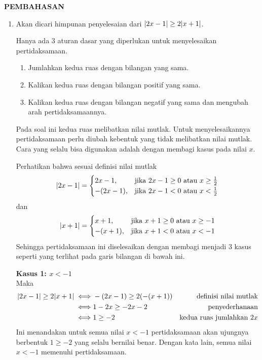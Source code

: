 \newpage
\begin{center}
\textbf{\large{PEMBAHASAN}}
\end{center}
\begin{enumerate}[leftmargin=*, label={\arabic*}.]
\item Akan dicari himpunan penyelesaian dari $\lvert2x-1\rvert \geq 2\lvert x+1\rvert$.

Hanya ada 3 aturan dasar yang diperlukan untuk menyelesaikan pertidaksamaan.
    \begin{enumerate}[label={\arabic*})]
    \item Jumlahkan kedua ruas dengan bilangan yang sama.
    \item Kalikan kedua ruas dengan bilangan positif yang sama.
    \item Kalikan kedua ruas dengan bilangan negatif yang sama dan 
    mengubah arah pertidaksamaannya.
    \end{enumerate}
Pada soal ini kedua ruas melibatkan nilai mutlak. Untuk menyelesaikannya 
pertidaksamaan perlu diubah kebentuk yang tidak melibatkan nilai mutlak. 
Cara yang selalu bisa digunakan adalah dengan membagi kasus pada nilai $x$.

Perhatikan bahwa sesuai definisi nilai mutlak
\[
\lvert2x-1\rvert = 
\begin{cases}
    2x-1, &\text{jika $2x-1 \geq 0$ atau $x \geq \frac{1}{2}$}\\
    -(2x-1), &\text{jika $2x-1 < 0$ atau $x < \frac{1}{2}$}
\end{cases}
\]
dan
\[
\lvert x+1\rvert = 
\begin{cases}
    x+1, &\text{jika $x+1 \geq 0$ atau $x \geq -1$}\\
    -(x+1), &\text{jika $x+1 < 0$ atau $x < -1$}
\end{cases}
\]
Sehingga pertidaksamaan ini diselesaikan dengan membagi menjadi 3 kasus seperti 
yang terlihat pada garis bilangan di bawah ini.



\textbf{Kasus 1: $x < -1$}\\
Maka
\begin{align*}
    \lvert2x-1\rvert \geq 2\lvert x+1\rvert 
    \iff &-(2x-1) \geq 2(-(x+1)) 
    &\text{definisi nilai mutlak} \\
    \iff &1-2x \geq -2x-2
    &\text{penyederhanaan}\\
    \iff &1 \geq -2
    &\text{kedua ruas jumlahkan $2x$}
\end{align*}
Ini menandakan untuk semua nilai $x < -1$ pertidaksamaan akan ujungnya 
berbentuk $1 \geq -2$ yang selalu bernilai benar. Dengan kata lain, semua 
nilai $x < -1$ memenuhi pertidaksamaan.


\end{enumerate}
